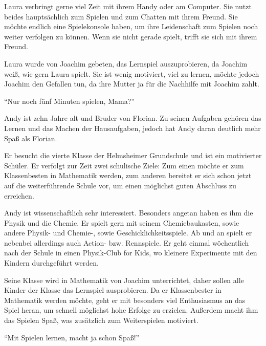\begin{description}
\begin{description}
			\item[Interessen und Hobbys]{Laura verbringt gerne viel Zeit mit ihrem Handy oder am Computer. Sie nutzt beides hauptsächlich zum Spielen und zum Chatten mit ihrem Freund. Sie möchte endlich eine Spielekonsole haben, um ihre Leidenschaft zum Spielen noch weiter verfolgen zu können. Wenn sie nicht gerade spielt, trifft sie sich mit ihrem Freund.}
			\item[Motivation]{Laura wurde von Joachim gebeten, das Lernspiel auszuprobieren, da Joachim weiß, wie gern Laura spielt. Sie ist wenig motiviert, viel zu lernen, möchte jedoch Joachim den Gefallen tun, da ihre Mutter ja für die Nachhilfe mit Joachim zahlt.}
			\item{\enquote{Nur noch fünf Minuten spielen, Mama?}}
		\end{description}
		\item[Andy Klein: Der Experte]<TODO: Bild>\hfill
		\begin{description}
			\item[Familiäres Umfeld]{Andy ist zehn Jahre alt und Bruder von Florian. Zu seinen Aufgaben gehören das Lernen und das Machen der Hausaufgaben, jedoch hat Andy daran deutlich mehr Spaß als Florian.}
			\item[Schulisches Umfeld]{Er besucht die vierte Klasse der Helmsheimer Grundschule und ist ein motivierter Schüler. Er verfolgt zur Zeit zwei schulische Ziele: Zum einen möchte er zum Klassenbesten in Mathematik werden, zum anderen bereitet er sich schon jetzt auf die weiterführende Schule vor, um einen möglichst guten Abschluss zu erreichen. }
			\item[Interessen und Hobbys]{Andy ist wissenschaftlich sehr interessiert. Besonders angetan haben es ihm die Physik und die Chemie. Er spielt gern mit seinem Chemiebaukasten, sowie andere Physik- und Chemie-, sowie Geschicklichkeitsspiele. Ab und an spielt er nebenbei allerdings auch Action- bzw. Rennspiele. Er geht einmal wöchentlich nach der Schule in einen Physik-Club for Kids, wo kleinere Experimente mit den Kindern durchgeführt werden.}
			\item[Motivation]{Seine Klasse wird in Mathematik von Joachim unterrichtet, daher sollen alle Kinder der Klasse das Lernspiel ausprobieren. Da er Klassenbester in Mathematik werden möchte, geht er mit besonders viel Enthusiasmus an das Spiel heran, um schnell möglichst hohe Erfolge zu erzielen. Außerdem macht ihm das Spielen Spaß, was zusätzlich zum Weiterspielen motiviert.}
			\item{\enquote{Mit Spielen lernen, macht ja schon Spaß!}}
		\end{description}
	\end{description}

